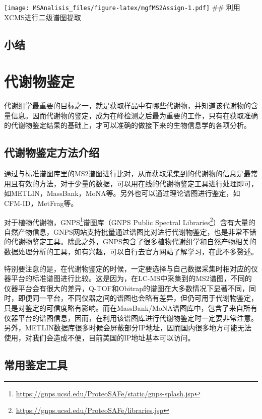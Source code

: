 \documentclass[]{ctexbook}
\renewcommand{\href}[2]{#2\footnote{\url{#1}}}
\begin{document}
\texttt{[image: MSAnalisis\_files/figure-latex/mgfMS2Assign-1.pdf]}
\#\# 利用XCMS进行二级谱图提取

\hypertarget{-1}{%
\section{小结}\label{-1}}

\hypertarget{chapID}{%
\chapter{代谢物鉴定}\label{chapID}}

代谢组学最重要的目标之一，就是获取样品中有哪些代谢物，并知道该代谢物的含量信息。因而代谢物的鉴定，成为在峰检测之后最为重要的工作，只有在获取准确的代谢物鉴定结果的基础上，才可以准确的做接下来的生物信息学的各项分析。

\section{代谢物鉴定方法介绍}

通过与标准谱图库里的MS2谱图进行比对，从而获取采集到的代谢物的信息是最常用且有效的方法，对于少量的数据，可以用在线的代谢物鉴定工具进行处理即可，如METLIN，MassBank，MoNA等。另外也可以通过理论谱图进行鉴定，如CFM-ID，MetFrag等。

对于植物代谢物，\href{https://gnps.ucsd.edu/ProteoSAFe/static/gnps-splash.jsp}{GNPS}谱图库（\href{https://gnps.ucsd.edu/ProteoSAFe/libraries.jsp}{GNPS Public Spectral Libraries}）含有大量的自然产物信息，GNPS网站支持批量通过谱图比对进行代谢物鉴定，也是非常不错的代谢物鉴定工具。除此之外，GNPS包含了很多植物代谢组学和自然产物相关的数据处理分析的工具，如有兴趣，可以自行去官方网站了解学习，在此不多赘述。

特别要注意的是，在代谢物鉴定的时候，一定要选择与自己数据采集时相对应的仪器平台的标准谱图进行比较。这是因为，在LC-MS中采集到的MS2谱图，不同的仪器平台会有很大的差异，Q-TOF和Obitrap的谱图在大多数情况下显著不同，同时，即便同一平台，不同仪器之间的谱图也会略有差异，但仍可用于代谢物鉴定，只是对鉴定的可信度略有影响。而在MassBank/MoNA谱图库中，包含了来自所有仪器平台的谱图信息，因而，在利用该谱图库进行代谢物鉴定时一定要非常注意。另外，METLIN数据库很多时候会屏蔽部分IP地址，因而国内很多地方可能无法使用，对我们会造成不便，目前美国的IP地址基本可以访问。

\section{常用鉴定工具}
\end{document}
